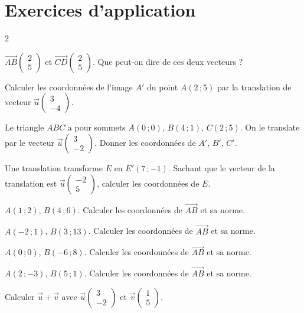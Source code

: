 \section{Exercices d'application}
\begin{multicols}{2}

\exo{} $\vec{AB}\begin{pmatrix}2\\5\end{pmatrix}$ et
$\vec{CD}\begin{pmatrix}2\\5\end{pmatrix}$. Que peut-on dire de ces deux vecteurs ?

\exo{} Calculer les coordonnées de l'image $A'$ du point $A(2\,;5)$ par la
translation de vecteur $\vec u\begin{pmatrix}3\\-4\end{pmatrix}$.

\exo{} Le triangle $ABC$ a pour sommets $A(0\,;0)$, $B(4\,;1)$, $C(2\,;5)$. On le
translate par le vecteur $\vec u\begin{pmatrix}3\\-2\end{pmatrix}$. Donner les coordonnées
de $A'$, $B'$, $C'$.

\exo{} Une translation transforme $E$ en $E'(7\,;-1)$. Sachant que le vecteur de la
translation est $\vec u\begin{pmatrix}-2\\5\end{pmatrix}$, calculer les coordonnées de $E$.

\exo{} $A(1\,;2)$, $B(4\,;6)$. Calculer les coordonnées de $\vec{AB}$ et sa norme.

\exo{} $A(-2\,;1)$, $B(3\,;13)$. Calculer les coordonnées de $\vec{AB}$ et sa
norme.

\exo{} $A(0\,;0)$, $B(-6\,;8)$. Calculer les coordonnées de $\vec{AB}$ et sa norme.

\exo{} $A(2\,;-3)$, $B(5\,;1)$. Calculer les coordonnées de $\vec{AB}$ et sa norme.

\exo{} Calculer $\vec u+\vec v$ avec $\vec u\begin{pmatrix}3\\-2\end{pmatrix}$ et
$\vec v\begin{pmatrix}1\\5\end{pmatrix}$.


\end{multicols}
